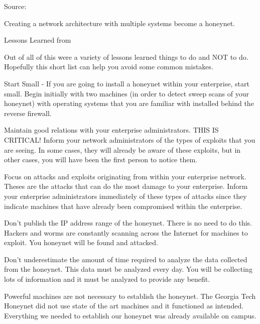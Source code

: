 \documentclass[Screen16to9,17pt]{foils}
\begin{document}
Source:



Creating a network architecture with multiple systems become a honeynet.

\begin{list2}
\item Lessons Learned from 
\item Out of all of this were a variety of lessons learned things to do and NOT to do. Hopefully this short list can help you avoid some common mistakes.

\item Start Small - If you are going to install a honeynet within your enterprise, start small. Begin initially with two machines (in order to detect sweep scans of your honeynet) with operating systems that you are familiar with installed behind the reverse firewall.
\item Maintain good relations with your enterprise administrators. THIS IS CRITICAL! Inform your network administrators of the types of exploits that you are seeing. In some cases, they will already be aware of these exploits, but in other cases, you will have been the first person to notice them.
\item Focus on attacks and exploits originating from within your enterprise network. Theses are the attacks that can do the most damage to your enterprise. Inform your enterprise administrators immediately of these types of attacks since they indicate machines that have already been compromised within the enterprise.
\item Don't publish the IP address range of the honeynet. There is no need to do this. Hackers and worms are constantly scanning across the Internet for machines to exploit. You honeynet will be found and attacked.
\item Don't underestimate the amount of time required to analyze the data collected from the honeynet. This data must be analyzed every day. You will be collecting lots of information and it must be analyzed to provide any benefit.
\item Powerful machines are not necessary to establish the honeynet. The Georgia Tech Honeynet did not use state of the art machines and it functioned as intended. Everything we needed to establish our honeynet was already available on campus.
\end{list2}
\end{document}
